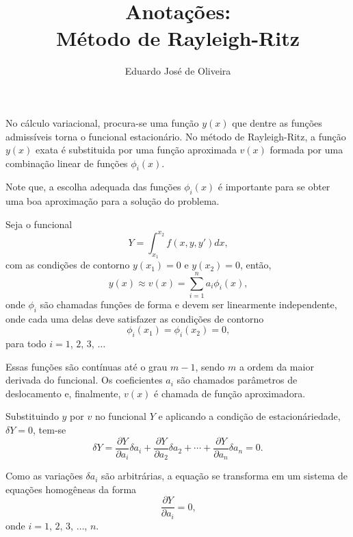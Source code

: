 \documentclass[12pt,a4paper]{article}
\author{Eduardo José de Oliveira}
\title{Anotações:\\Método de Rayleigh-Ritz}
\begin{document}
\maketitle

No cálculo variacional, procura-se uma função $y(x)$ que dentre as funções admissíveis torna o funcional estacionário. No método de Rayleigh-Ritz, a função $y(x)$ exata é substituida por uma função aproximada $v(x)$ formada por uma combinação linear de funções $\phi_i(x)$.

Note que, a escolha adequada das funções $\phi_i(x)$ é importante para se obter uma boa aproximação para a solução do problema.

Seja o funcional 
$$
	Y=\int_{x_1}^{x_2} f(x,y,y')dx\text{,}
$$ 
com as condições de contorno $y(x_1)=0$ e $y(x_2)=0$, então,
$$
	y(x) \approx 
	v(x) =
	\sum_{i=1}^{n} a_i \phi_i (x)
	\text{,}
$$
onde $\phi_i$ são chamadas funções de forma e devem ser linearmente independente, onde cada uma delas deve satisfazer as condições de contorno
$$
	\phi_i(x_1) = 
	\phi_i(x_2) = 
	0
	\text{,}
$$
para todo $i=1$, $2$, $3$, $\dots$

Essas funções são contínuas até o grau $m-1$, sendo $m$ a ordem da maior derivada do funcional. Os coeficientes $a_i$ são chamados parâmetros de deslocamento e, finalmente, $v(x)$ é chamada de função aproximadora.

Substituindo $y$ por $v$ no funcional $Y$ e aplicando a condição de estacionáriedade, $\delta Y=0$, tem-se
$$
	\delta Y = 
	\frac{\partial Y}{\partial a_i} \delta a_i
	+
	\frac{\partial Y}{\partial a_2} \delta a_2
	+ \cdots +
	\frac{\partial Y}{\partial a_n} \delta a_n
	= 0\text{.}
$$

Como as variações $\delta a_i$ são arbitrárias, a equação se transforma em um sistema de equações homogêneas da forma
$$
	\frac{\partial Y}{\partial a_i} = 0
	\text{,}
$$
onde $i=1$, $2$, $3$, $\dots$, $n$.

\newpage
\end{document}
